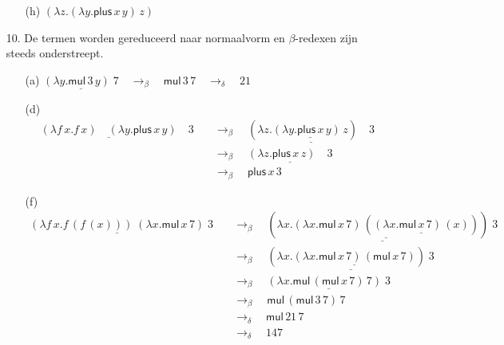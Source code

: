 \documentclass[a4paper,11pt]{article}
\begin{document}
\begin{enumerate}
\begin{enumerate}
\item[(h)] $(\lambda z. (\lambda y. \textsf{plus} \, x \, y) \, z)$

\end{enumerate}


\item[10.]
De termen worden gereduceerd naar normaalvorm en $\beta$-redexen zijn steeds
onderstreept.
\begin{enumerate}

\item[(a)]
$\underline{(\lambda y. \textsf{mul} \, 3 \, y) \; 7}
  \quad \rightarrow_{\beta} \quad
  \textsf{mul} \, 3 \, 7
  \quad \rightarrow_{\delta} \quad
  21$

\item[(d)]
\begin{align*}
  \underline{(\lambda f \, x. f \, x) \quad (\lambda y. \textsf{plus} \, x \, y)} \quad 3
  & \quad \rightarrow_{\beta} \quad
  \underline{(\lambda z. \underline{(\lambda y. \textsf{plus} \, x \, y) \, z}) \quad 3} \\
  & \quad \rightarrow_{\beta} \quad
  \underline{(\lambda z. \textsf{plus} \, x \, z) \quad 3} \\
  & \quad \rightarrow_{\beta} \quad
  \textsf{plus} \, x \, 3
\end{align*}

\item[(f)]
\begin{align*}
  \underline{(\lambda f \, x. f \, (f \, (x))) \; (\lambda x. \textsf{mul} \, x \, 7)} \; 3
  & \quad \rightarrow_{\beta} \quad
  \underline{(\lambda x. \underline{(\lambda x. \textsf{mul} \, x \, 7) \, (\underline{(\lambda x. \textsf{mul} \, x \, 7) \, (x)})}) \; 3} \\
  & \quad \rightarrow_{\beta} \quad
  \underline{(\lambda x. \underline{(\lambda x. \textsf{mul} \, x \, 7) \, (\textsf{mul} \, x \, 7)}) \; 3} \\
  & \quad \rightarrow_{\beta} \quad
  \underline{(\lambda x. \textsf{mul} \, (\textsf{mul} \, x \, 7) \, 7) \; 3} \\
  & \quad \rightarrow_{\beta} \quad
  \textsf{mul} \, (\textsf{mul} \, 3 \, 7) \, 7 \\
  & \quad \rightarrow_{\delta} \quad
  \textsf{mul} \, 21 \, 7 \\
  & \quad \rightarrow_{\delta} \quad
  147
\end{align*}

\end{enumerate}


\end{enumerate}
\end{document}
